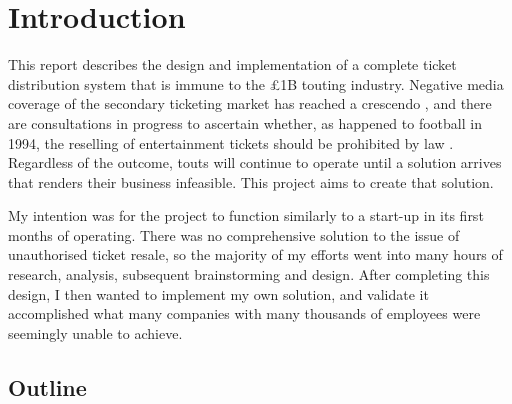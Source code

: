 \documentclass[12pt,a4paper]{bhamdissertation}
\begin{document}
\chapter{Introduction}

This report describes the design and implementation of a complete ticket distribution system that is immune to the £1B \cite{MF16} touting industry. Negative media coverage of the secondary ticketing market has reached a crescendo \cite{JR16}, and there are consultations in progress to ascertain whether, as happened to football in 1994, the reselling of entertainment tickets should be prohibited by law \cite{H15}. Regardless of the outcome, touts will continue to operate until a solution arrives that renders their business infeasible. This project aims to create that solution.

My intention was for the project to function similarly to a start-up in its first months of operating. There was no comprehensive solution to the issue of unauthorised ticket resale, so the majority of my efforts went into many hours of research, analysis, subsequent brainstorming and design. After completing this design, I then wanted to implement my own solution, and validate it accomplished what many companies with many thousands of employees were seemingly unable to achieve.

\section{Outline}
\end{document}
